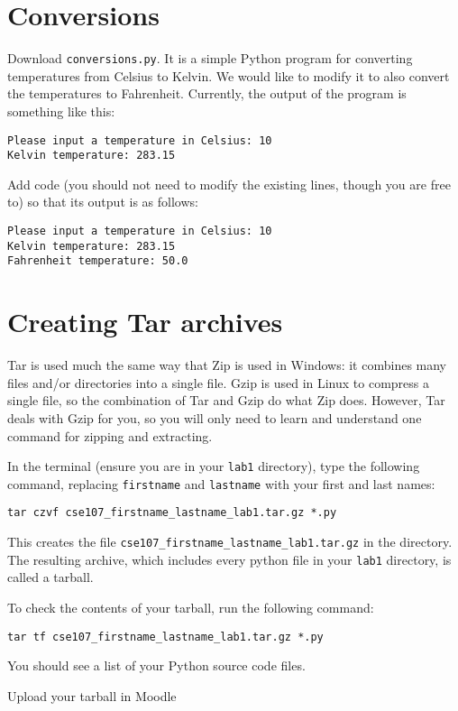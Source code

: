 \documentclass[12pt]{article}
\begin{document}
\pagebreak

\section{Conversions}
Download \texttt{conversions.py}. It is a simple Python program for converting temperatures from Celsius to Kelvin. We would like to modify it to also convert the temperatures to Fahrenheit. Currently, the output of the program is something like this:

\begin{lstlisting}[style=c]
Please input a temperature in Celsius: 10
Kelvin temperature: 283.15
\end{lstlisting}

Add code (you should not need to modify the existing lines, though you are free to) so that its output is as follows:

\begin{lstlisting}[style=c]
Please input a temperature in Celsius: 10
Kelvin temperature: 283.15
Fahrenheit temperature: 50.0
\end{lstlisting}



\section{Creating Tar archives}

Tar is used much the same way that Zip is used in Windows: it combines many files and/or directories into a single file. Gzip is used in Linux to compress a single file, so the combination of Tar and Gzip do what Zip does. However, Tar deals with Gzip for you, so you will only need to learn and understand one command for zipping and extracting.

In the terminal (ensure you are in your \texttt{lab1} directory), type the following command, replacing \texttt{firstname} and \texttt{lastname} with your first and last names:

\begin{lstlisting}[style=bash]
tar czvf cse107_firstname_lastname_lab1.tar.gz *.py
\end{lstlisting}

This creates the file \texttt{cse107\_firstname\_lastname\_lab1.tar.gz} in the directory. The resulting archive, which includes every python file in your \texttt{lab1} directory, is called a tarball. 

To check the contents of your tarball, run the following command:

\begin{lstlisting}[style=bash]
tar tf cse107_firstname_lastname_lab1.tar.gz *.py
\end{lstlisting}

You should see a list of your Python source code files.

Upload your tarball in Moodle
\end{document}
